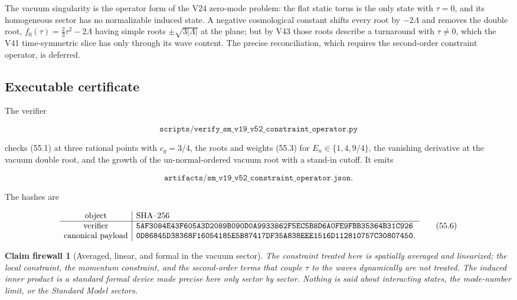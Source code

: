 \documentclass[11pt]{article}
\newtheorem{firewall}[theorem]{Claim firewall}
\theoremstyle{remark}
\begin{document}
The vacuum singularity is the operator form of the V24 zero-mode
problem: the flat static torus is the only state with \(\tau=0\), and
its homogeneous sector has no normalizable induced state.  A negative
cosmological constant shifts every root by \(-2\Lambda\) and removes the
double root, \(f_0(\tau)=\tfrac23\tau^2-2\Lambda\) having simple roots
\(\pm\sqrt{3|\Lambda|}\) at the plane; but by V43 those roots
describe a turnaround with \(\tau\neq0\), which the V41 time-symmetric
slice has only through its wave content.  The precise reconciliation,
which requires the second-order constraint operator, is deferred.

\subsection{Executable certificate}

The verifier

\[
 \texttt{scripts/verify\_sm\_v19\_v52\_constraint\_operator.py}      \tag{55.4}
\]

checks (55.1) at three rational points with \(c_g=3/4\), the roots and
weights (55.3) for \(E_n\in\{1,4,9/4\}\), the vanishing derivative at
the vacuum double root, and the growth of the un-normal-ordered
vacuum root with a stand-in cutoff.  It emits

\[
 \texttt{artifacts/sm\_v19\_v52\_constraint\_operator.json}.         \tag{55.5}
\]

The hashes are

\[
\begin{array}{c|l}
\hbox{object}&\hbox{SHA--256}\\ \hline
\hbox{verifier}&
\texttt{5AF3084E43F605A3D2089B090D0A9933862F5EC5B8D6A0FE9FBB35364B31C926}\\
\hbox{canonical payload}&
\texttt{0D86845D38368F16054185E5B87417DF35A838EEE1516D112810757C30807450}.
\end{array}                                                     \tag{55.6}
\]

\begin{firewall}[Averaged, linear, and formal in the vacuum sector]
\label{fire:v19v52}
The constraint treated here is spatially averaged and linearized; the
local constraint, the momentum constraint, and the second-order terms
that couple \(\tau\) to the waves dynamically are not treated.  The
induced inner product is a standard formal device made precise here
only sector by sector.  Nothing is said about interacting states, the
mode-number limit, or the Standard Model sectors.
\end{firewall}
\end{document}
